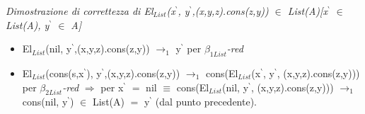 \vspace{0.5cm}
\noindent
\normalsize \textit{Dimostrazione di correttezza di El$_{List}$(x$^\backprime$, y$^\backprime$,(x,y,z).cons(z,y)) $\in$ List(A)[x$^\backprime$ $\in$ List(A), y$^\backprime$ $\in$ A]}
\begin{itemize}
\item El$_{List}$(nil, y$^\backprime$,(x,y,z).cons(z,y)) $\rightarrow_1$ y$^\backprime$ per \textit{$\beta_{1List}$-red}
\item El$_{List}$(cons(s,x$^\backprime$), y$^\backprime$,(x,y,z).cons(z,y)) $\rightarrow_1$ cons(El$_{List}$(x$^\backprime$, y$^\backprime$, (x,y,z).cons(z,y))) per \textit{$\beta_{2List}$-red} $\Rightarrow$ per x$^\backprime$ $=$ nil $\equiv$ cons(El$_{List}$(nil, y$^\backprime$, (x,y,z).cons(z,y))) $\rightarrow_1$ cons(nil, y$^\backprime$) $\in$ List(A) $=$ y$^\backprime$ (dal punto precedente).
\end{itemize}



